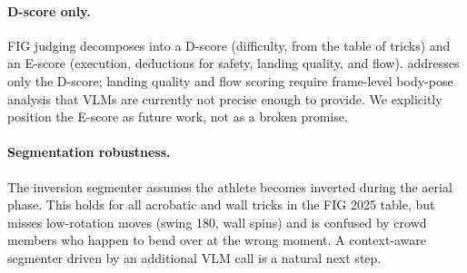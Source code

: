 \paragraph{D-score only.}
FIG judging decomposes into a D-score (difficulty, from the table of
tricks) and an E-score (execution, deductions for safety, landing
quality, and flow). \sys{} addresses only the D-score; landing quality
and flow scoring require frame-level body-pose analysis that VLMs are
currently not precise enough to provide. We explicitly position the
E-score as future work, not as a broken promise.

\paragraph{Segmentation robustness.}
The inversion segmenter assumes the athlete becomes inverted during the
aerial phase. This holds for all acrobatic and wall tricks in the FIG
2025 table, but misses low-rotation moves (swing 180, wall spins) and
is confused by crowd members who happen to bend over at the wrong
moment. A context-aware segmenter driven by an additional VLM call is a
natural next step.
